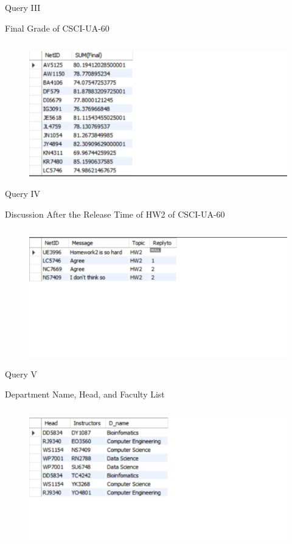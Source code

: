 \documentclass[a4paper,10pt]{beamer}
\begin{document}
\begin{frame}{Query III}
\begin{block}{Final Grade of CSCI-UA-60}
    \inputminted[linenos]{mysql}{3.txt}
\end{block}
\begin{figure}[H]
    \includegraphics[width=\textwidth]{3.png}
\end{figure}
\end{frame}

\begin{frame}{Query IV}
\begin{block}{Discussion After the Release Time of HW2 of CSCI-UA-60}
    \inputminted[linenos]{mysql}{4.txt}
\end{block}
\begin{figure}[H]
    \includegraphics[width=\textwidth]{4.png}
\end{figure}
\end{frame}

\begin{frame}{Query V}
\begin{block}{Department Name, Head, and Faculty List}
    \inputminted[linenos]{mysql}{5.txt}
\end{block}
\begin{figure}[H]
    \includegraphics[width=\textwidth]{5.png}
\end{figure}
\end{frame}
\end{document}
